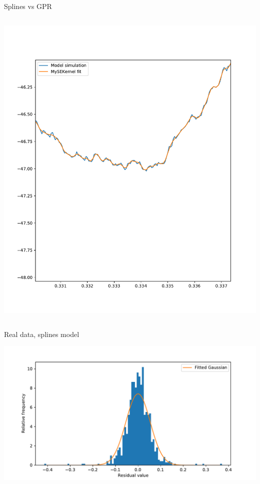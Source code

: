 \documentclass[presentation]{beamer}
\begin{document}
\begin{frame}[plain,label={sec:org4172f2d}]{Splines vs GPR}
\begin{columns}
\begin{column}{0.5\columnwidth}
\begin{center}
\includegraphics[width=1.1\textwidth]{./SEKernel2.pdf}
\end{center}
\end{column}
\end{columns}
\end{frame}


\begin{frame}[label={sec:org899c8a7}]{Real data, splines model}
\begin{center}
\includegraphics[width=.9\textwidth]{./hist.pdf}
\end{center}
\vfill
\end{frame}
\end{document}

